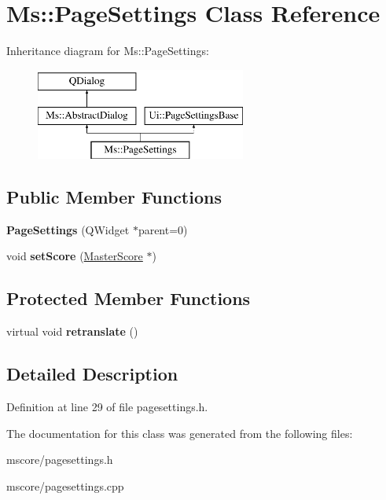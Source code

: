 \hypertarget{class_ms_1_1_page_settings}{}\section{Ms\+:\+:Page\+Settings Class Reference}
\label{class_ms_1_1_page_settings}
Inheritance diagram for Ms\+:\+:Page\+Settings\+:\begin{figure}[H]
\begin{center}
\leavevmode
\includegraphics[height=3.000000cm]{class_ms_1_1_page_settings}
\end{center}
\end{figure}
\subsection*{Public Member Functions}
\begin{DoxyCompactItemize}
\item 
\mbox{\label{class_ms_1_1_page_settings_aa95c81cfb8ca5b1f40a38724f3ce517c}} 
{\bfseries Page\+Settings} (Q\+Widget $\ast$parent=0)
\item 
\mbox{\label{class_ms_1_1_page_settings_a05ec4c59c1622e889a3e11add486be17}} 
void {\bfseries set\+Score} (\hyperlink{class_ms_1_1_master_score}{Master\+Score} $\ast$)
\end{DoxyCompactItemize}
\subsection*{Protected Member Functions}
\begin{DoxyCompactItemize}
\item 
\mbox{\label{class_ms_1_1_page_settings_aeb475808395bb81d9b14845512031683}} 
virtual void {\bfseries retranslate} ()
\end{DoxyCompactItemize}


\subsection{Detailed Description}


Definition at line 29 of file pagesettings.\+h.



The documentation for this class was generated from the following files\+:\begin{DoxyCompactItemize}
\item 
mscore/pagesettings.\+h\item 
mscore/pagesettings.\+cpp\end{DoxyCompactItemize}
